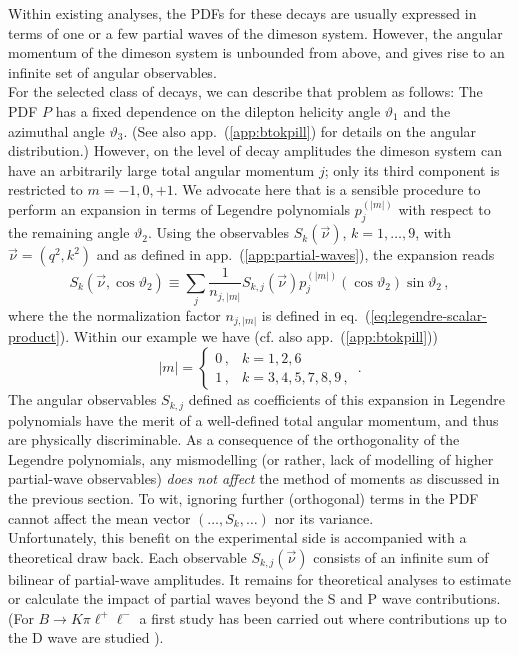 \documentclass[aps,prd,reprint,nofootinbib,preprintnumbers]{revtex4}
\newcommand{\refapp}[1]{app.~(\ref{app:#1})}
\newcommand{\refeq}[1]{eq.~(\ref{eq:#1})}
\renewcommand{\theta}{\vartheta}
\begin{document}
Within existing analyses, the PDFs for these decays are usually expressed in terms of one or a few
partial waves of the dimeson system. However, the angular momentum of the dimeson system is unbounded
from above, and gives rise to an infinite set of angular observables.\\

For the selected class of decays, we can describe that problem as follows: The PDF $P$ has a fixed dependence on the dilepton
helicity angle $\theta_1$ and the azimuthal angle $\theta_3$. (See also \refapp{btokpill} for details
on the angular distribution.) However, on the level of decay amplitudes the dimeson system can have an arbitrarily
large total angular momentum $j$; only its third component is restricted to $m = -1,0,+1$.
We advocate here that is a sensible procedure to perform an expansion in terms of Legendre polynomials $p_{j}^{(|m|)}$
with respect to the remaining angle $\theta_2$. Using the observables $S_k(\vec{\nu})$, $k=1,\dots,9$, with $\vec{\nu}=(q^2, k^2)$
and as defined in \refapp{partial-waves}, the expansion reads
\begin{equation}
    S_{k}(\vec{\nu},\cos\theta_2) \equiv \sum_{j} \frac{1}{n_{j,|m|}} S_{k,j}(\vec{\nu}) p_{j}^{(|m|)}(\cos\theta_2)\sin\theta_2\,,
\end{equation}
where the the normalization factor $n_{j,|m|}$ is defined in \refeq{legendre-scalar-product}. Within our
example we have (cf. also \refapp{btokpill})
\begin{equation}
    |m| = \begin{cases}
        0\,, & k = 1,2,6\,\\
        1\,, & k = 3,4,5,7,8,9\,,
    \end{cases}\,.
\end{equation}
The angular observables $S_{k,j}$ defined as coefficients of this expansion in Legendre polynomials
have the merit of a well-defined total angular momentum, and thus are physically discriminable.
As a consequence of the orthogonality of the Legendre polynomials, any mismodelling (or rather, lack of modelling of higher
partial-wave observables) \emph{does not affect} the method of moments as discussed in the previous section. To wit,
ignoring further (orthogonal) terms in the PDF cannot affect the mean vector $(\dots, S_k, \dots)$ nor its variance.\\

Unfortunately, this benefit on the experimental side is accompanied with a theoretical draw back. Each observable
$S_{k,j}(\vec{\nu})$ consists of an infinite sum of bilinear of partial-wave amplitudes. It remains for theoretical
analyses to estimate or calculate the impact of partial waves beyond the S and P wave contributions.
(For $B\to K\pi\ell^+\ell^-$ a first study has been carried out where contributions up to the D wave are studied \cite{Das:2014sra}).\\
\end{document}
